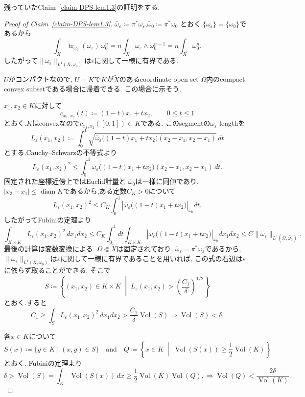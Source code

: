 \documentclass[dvipdfmx,a4paper,11pt]{article} %
\theoremstyle{definition}
\theoremstyle{remark}
\numberwithin{equation}{section}
\newcommand{\diam}{\operatorname{diam}}
\DeclareMathOperator{\Vol}{Vol}
\begin{document}
残っていたClaim~\ref{claim-DPS-lem1.3}の証明をする.
\begin{proof}[Proof of Claim~\ref{claim-DPS-lem1.3}]
\(
\widetilde{\omega_\varepsilon}\coloneqq \pi^*\omega_\varepsilon
\),\(\widetilde{\omega_0}\coloneqq \pi^*\omega_0
\)
とおく.$\{\omega_\varepsilon\}=\{\omega_0\}$であるから
\[
\int_X\operatorname{tr}_{\omega_0}(\omega_\varepsilon)\,\omega_0^n
=n\int_X\omega_\varepsilon\wedge\omega_0^{n-1}
=n\int_X\omega_0^n.
\]
したがって$\lVert\omega_\varepsilon\rVert_{L^1(X,\omega_0)}$は$\varepsilon$に関して一様に有界である.

$U$がコンパクトなので, $U=K$で$K$が$\widetilde X$のあるcoordinate open set
$\Omega$内のcompact convex subsetである場合に帰着できる. この場合に示そう. 

$x_1,x_2\in K$に対して
\[
c_{x_1,x_2}(t)\coloneqq (1-t)x_1+tx_2,\qquad 0\leq t\leq1
\]
とおく.$K$はconvexなので$c_{x_1,x_2}([0,1])\subset K$である.
このsegmentの$\widetilde{\omega_\varepsilon}$-lengthを
\[
L_\varepsilon(x_1,x_2)
\coloneqq 
\int_0^1
\sqrt{
\widetilde{\omega_\varepsilon}
\bigl((1-t)x_1+tx_2\bigr)
(x_2-x_1,x_2-x_1)
}\,dt
\]
とする.Cauchy--Schwarzの不等式より
\[
L_\varepsilon(x_1,x_2)^2
\leq
\int_0^1
\widetilde{\omega_\varepsilon}
\bigl((1-t)x_1+tx_2\bigr)
(x_2-x_1,x_2-x_1)\,dt.
\]
固定された座標近傍上ではEuclid計量と
$\widetilde{\omega_0}$は一様に同値であり,
$\lvert x_2-x_1\rvert\leq\diam K$であるから,ある定数$C_K>0$について
\[
L_\varepsilon(x_1,x_2)^2
\leq
C_K\int_0^1
\left\lvert 
\widetilde{\omega_\varepsilon}
\bigl((1-t)x_1+tx_2\bigr)
\right\rvert_{\widetilde{\omega_0}}dt.
\]
したがってFubiniの定理より
\[
\int_{K\times K}L_\varepsilon(x_1,x_2)^2\,dx_1dx_2
\leq
C_K\int_0^1dt\int_{K\times K}
\left\lvert 
\widetilde{\omega_\varepsilon}
\bigl((1-t)x_1+tx_2\bigr)
\right\rvert_{\widetilde{\omega_0}}
dx_1dx_2
\leq
C\lVert\widetilde{\omega_\varepsilon}\rVert_{L^1(\Omega,\widetilde{\omega_0})}.
\]
最後の計算は変数変換による. 
$\Omega\Subset\widetilde X$は固定されており,
$\widetilde{\omega_\varepsilon}=\pi^*\omega_\varepsilon$であるから, $\lVert\omega_\varepsilon\rVert_{L^1(X,\omega_0)}$は$\varepsilon$に関して一様に有界であることを用いれば, この式の右辺は$\varepsilon$に依らず取ることができる.
そこで
\[
S\coloneqq 
\left\{
(x_1,x_2)\in K\times K\;\middle\vert\;
L_\varepsilon(x_1,x_2)>
\left(\frac{C_1}{\delta}\right)^{1/2}
\right\}
\]
とおく.すると
\[
C_1
\geq
\int_S L_\varepsilon(x_1,x_2)^2\,dx_1dx_2
>
\frac{C_1}{\delta}\Vol(S)
\Rightarrow \Vol(S)<\delta.
\]

各$x\in K$について
\[
S(x)\coloneqq \{y\in K\mid (x,y)\in S\}
\quad \text{and} \quad
Q\coloneqq 
\left\{
x\in K\;\middle\vert\;
\Vol(S(x))
\geq\frac12\Vol(K)
\right\}
\]
とおく. Fubiniの定理より
\[
\delta>\Vol(S)
=\int_K\Vol(S(x))\,dx
\geq
\frac12\Vol(K)\Vol(Q),
\Rightarrow 
\Vol(Q)
<
\frac{2\delta}{\Vol(K)}.
\]


\end{proof}
\end{document}
